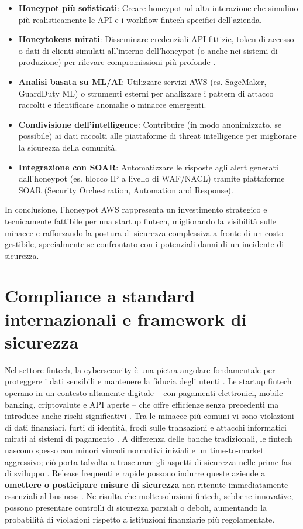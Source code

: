 \documentclass[a4paper,12pt]{report}
\begin{document}
\begin{itemize}
    \item \textbf{Honeypot più sofisticati}: Creare honeypot ad alta interazione che simulino più realisticamente le API e i workflow fintech specifici dell'azienda.
    \item \textbf{Honeytokens mirati}: Disseminare credenziali API fittizie, token di accesso o dati di clienti simulati all'interno dell'honeypot (o anche nei sistemi di produzione) per rilevare compromissioni più profonde \cite{10183431}.
    \item \textbf{Analisi basata su ML/AI}: Utilizzare servizi AWS (es. SageMaker, GuardDuty ML) o strumenti esterni per analizzare i pattern di attacco raccolti e identificare anomalie o minacce emergenti.
    \item \textbf{Condivisione dell'intelligence}: Contribuire (in modo anonimizzato, se possibile) ai dati raccolti alle piattaforme di threat intelligence per migliorare la sicurezza della comunità.
    \item \textbf{Integrazione con SOAR}: Automatizzare le risposte agli alert generati dall'honeypot (es. blocco IP a livello di WAF/NACL) tramite piattaforme SOAR (Security Orchestration, Automation and Response).
\end{itemize}

In conclusione, l'honeypot AWS rappresenta un investimento strategico e tecnicamente fattibile per una startup fintech, migliorando la visibilità sulle minacce e rafforzando la postura di sicurezza complessiva a fronte di un costo gestibile, specialmente se confrontato con i potenziali danni di un incidente di sicurezza.


\chapter{Compliance a standard internazionali e framework di sicurezza} 
\label{chapter:introduzione}

Nel settore fintech, la cybersecurity è una pietra angolare fondamentale per proteggere i dati sensibili e mantenere la fiducia degli utenti \cite{netguru2023}. Le startup fintech operano in un contesto altamente digitale – con pagamenti elettronici, mobile banking, criptovalute e API aperte – che offre efficienze senza precedenti ma introduce anche rischi significativi \cite{netguru2023}. Tra le minacce più comuni vi sono violazioni di dati finanziari, furti di identità, frodi sulle transazioni e attacchi informatici mirati ai sistemi di pagamento \cite{netguru2023}. A differenza delle banche tradizionali, le fintech nascono spesso con minori vincoli normativi iniziali e un time-to-market aggressivo; ciò porta talvolta a trascurare gli aspetti di sicurezza nelle prime fasi di sviluppo \cite{netguru2023}. Release frequenti e rapide possono indurre queste aziende a \textbf{omettere o posticipare misure di sicurezza} non ritenute immediatamente essenziali al business \cite{netguru2023}. Ne risulta che molte soluzioni fintech, sebbene innovative, possono presentare controlli di sicurezza parziali o deboli, aumentando la probabilità di violazioni rispetto a istituzioni finanziarie più regolamentate.
\end{document}
